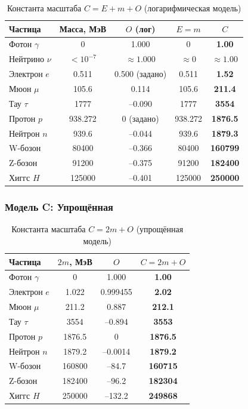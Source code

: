 \documentclass[12pt,a4paper]{article}
\begin{document}
\begin{table}[h]
    \centering
    \caption{Константа масштаба $C = E + m + O$ (логарифмическая модель)}
    \begin{tabular}{lcccc}
        \toprule
        Частица & Масса, МэВ & $O$ (лог) & $E=m$ & $C$ \\
        \midrule
        Фотон $\gamma$ & 0 & 1.000 & 0 & \textbf{1.00} \\
        Нейтрино $\nu$ & $<10^{-7}$ & $\approx 1.000$ & $\approx 0$ & $\approx 1.00$ \\
        Электрон $e$ & 0.511 & 0.500 (задано) & 0.511 & \textbf{1.52} \\
        Мюон $\mu$ & 105.6 & 0.114 & 105.6 & \textbf{211.4} \\
        Тау $\tau$ & 1777 & --0.090 & 1777 & \textbf{3554} \\
        Протон $p$ & 938.272 & 0 (задано) & 938.272 & \textbf{1876.5} \\
        Нейтрон $n$ & 939.6 & --0.044 & 939.6 & \textbf{1879.3} \\
        W-бозон & 80400 & --0.366 & 80400 & \textbf{160799} \\
        Z-бозон & 91200 & --0.375 & 91200 & \textbf{182400} \\
        Хиггс $H$ & 125000 & --0.401 & 125000 & \textbf{250000} \\
        \bottomrule
    \end{tabular}
    \label{tab:modelB}
\end{table}

\subsubsection{Модель C: Упрощённая}

\begin{table}[h]
    \centering
    \caption{Константа масштаба $C = 2m + O$ (упрощённая модель)}
    \begin{tabular}{lccc}
        \toprule
        Частица & $2m$, МэВ & $O$ & $C = 2m + O$ \\
        \midrule
        Фотон $\gamma$ & 0 & 1.000 & \textbf{1.00} \\
        Электрон $e$ & 1.022 & 0.999455 & \textbf{2.02} \\
        Мюон $\mu$ & 211.2 & 0.887 & \textbf{212.1} \\
        Тау $\tau$ & 3554 & --0.894 & \textbf{3553} \\
        Протон $p$ & 1876.5 & 0 & \textbf{1876.5} \\
        Нейтрон $n$ & 1879.2 & --0.0014 & \textbf{1879.2} \\
        W-бозон & 160800 & --84.7 & \textbf{160715} \\
        Z-бозон & 182400 & --96.2 & \textbf{182304} \\
        Хиггс $H$ & 250000 & --132.2 & \textbf{249868} \\
        \bottomrule
    \end{tabular}
    \label{tab:modelC}
\end{table}
\end{document}
